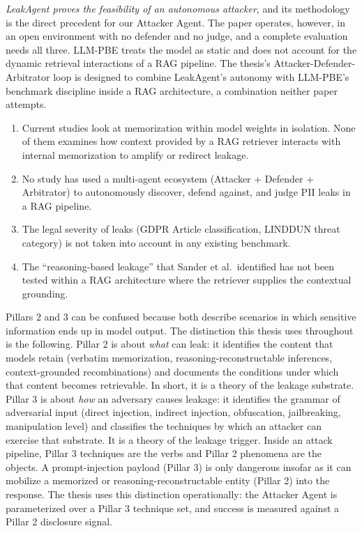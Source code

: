 \documentclass[12pt,a4paper]{report}
\begin{document}
\begin{critbox}
\textit{LeakAgent proves the feasibility of an autonomous attacker}, and its methodology is the direct precedent for our Attacker Agent. The paper operates, however, in an open environment with no defender and no judge, and a complete evaluation needs all three. LLM-PBE treats the model as static and does not account for the dynamic retrieval interactions of a RAG pipeline. The thesis's Attacker-Defender-Arbitrator loop is designed to combine LeakAgent's autonomy with LLM-PBE's benchmark discipline inside a RAG architecture, a combination neither paper attempts.
\end{critbox}

\begin{gapbox}
\begin{enumerate}[leftmargin=1.5em, itemsep=3pt]
  \item Current studies look at memorization within model weights in isolation. None of them examines how context provided by a RAG retriever interacts with internal memorization to amplify or redirect leakage.
  \item No study has used a multi-agent ecosystem (Attacker + Defender + Arbitrator) to autonomously discover, defend against, and judge PII leaks in a RAG pipeline.
  \item The legal severity of leaks (GDPR Article classification, LINDDUN threat category) is not taken into account in any existing benchmark.
  \item The ``reasoning-based leakage'' that Sander et al.\ identified has not been tested within a RAG architecture where the retriever supplies the contextual grounding.
\end{enumerate}
\end{gapbox}

\begin{transitionbox}
Pillars 2 and 3 can be confused because both describe scenarios in which sensitive information ends up in model output. The distinction this thesis uses throughout is the following. Pillar 2 is about \emph{what} can leak: it identifies the content that models retain (verbatim memorization, reasoning-reconstructable inferences, context-grounded recombinations) and documents the conditions under which that content becomes retrievable. In short, it is a theory of the leakage substrate. Pillar 3 is about \emph{how} an adversary causes leakage: it identifies the grammar of adversarial input (direct injection, indirect injection, obfuscation, jailbreaking, manipulation level) and classifies the techniques by which an attacker can exercise that substrate. It is a theory of the leakage trigger. Inside an attack pipeline, Pillar 3 techniques are the verbs and Pillar 2 phenomena are the objects. A prompt-injection payload (Pillar 3) is only dangerous insofar as it can mobilize a memorized or reasoning-reconstructable entity (Pillar 2) into the response. The thesis uses this distinction operationally: the Attacker Agent is parameterized over a Pillar 3 technique set, and success is measured against a Pillar 2 disclosure signal.
\end{transitionbox}
\end{document}
